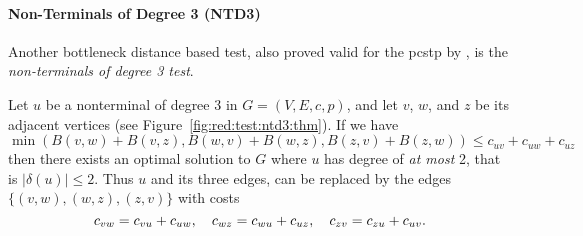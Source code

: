 \paragraph{Non-Terminals of Degree 3 (NTD3)}\label{sec:red:test:deg3}
Another bottleneck distance based test,
also proved valid for the \gls{pcstp} by \citet{uchoa2006reduction},
is the \textit{non-terminals of degree 3 test}.
\begin{theorem}\label{thm:ntd3}
  Let $u$ be a nonterminal of degree 3 in $G = (V, E, c, p)$,
  and let $v$, $w$, and $z$ be its adjacent
  vertices (see Figure~\ref{fig:red:test:ntd3:thm}). If we have
  $$\min\left(B(v,w) + B(v,z), B(w,v) + B(w,z),  B(z, v)+ B(z, w)\right) \leq
  c_{uv} + c_{uw} + c_{uz}$$
  then there exists an optimal solution to $G$ where $u$ has degree of
  \textit{at most} 2, that is $|\delta(u)| \leq 2$. Thus $u$ and its three edges, can be replaced by
  the edges $\{(v, w), (w,z), (z,v)\}$ with costs
  $$c_{vw} = c_{vu} + c_{uw},\quad c_{wz} = c_{wu} + c_{uz},\quad c_{zv} = c_{zu} + c_{uv}\mathnormal{.}$$
\end{theorem}
